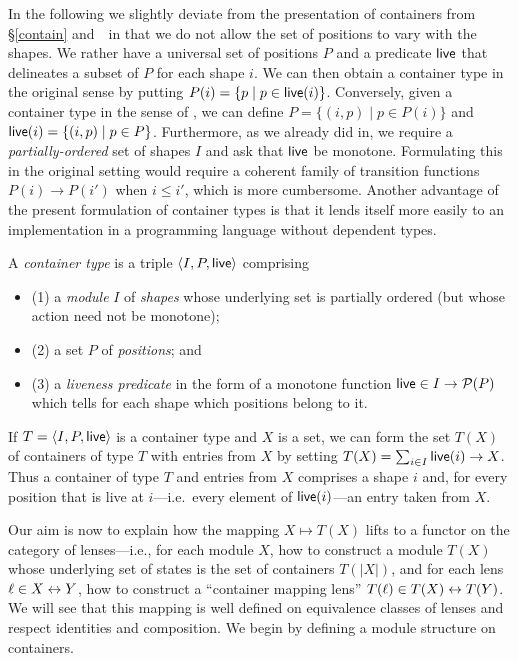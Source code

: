 In the following we slightly deviate from the presentation of
containers from \ifdissertation\S\ref{contain}
and~\cite{1195941}\else\cite{1195941,HofmannPierceWagner10}\fi\ in that we do not
allow the set of positions to vary with the shapes. We rather have a
universal set of positions $P$ and a predicate $\mathsf{live}$ that delineates
a subset of $P$ for each shape $i$. We can then obtain a container
type in the original sense by putting $P(i)=\{p\mid
p\in\mathsf{live}(i)\}$. Conversely, given a container type in the sense of
\cite{1195941}, we can define $P=\{(i,p)\mid p\in P(i)\}$ and
$\mathsf{live}(i)=\{(i,p)\mid p\in P\}$. Furthermore, as we already did
in\symmlenses, we require a \emph{partially-ordered}
set of shapes $I$ and ask that $\mathsf{live}$ be monotone. Formulating
this in the original setting would require a coherent family of
transition functions $P(i)\rightarrow P(i')$ when $i\leq i'$, which is
more cumbersome. Another advantage of the present formulation of
container types is that it lends itself more easily to an
implementation in a programming language without dependent types.
\begin{defn}
A \emph{container type} is a triple $\left<I,P,\mathsf{live}\right>$ comprising 
\iffull \begin{itemize} \fi
\iffull \item \else (1) \fi a \emph{module} $I$ of \emph{shapes} whose underlying set is partially
ordered (but whose action need not be monotone);
\iffull \item \else (2) \fi a set $P$ of \emph{positions}; and
\iffull \item \else (3) \fi a \emph{liveness predicate}
  in the form of a monotone function $\mathsf{live} \in I \to \mathcal{P}(P)$ which tells
  for each shape which positions belong to it.  
\iffull \end{itemize} \fi
\end{defn}

If $T=\langle I,P,\mathsf{live}\rangle$ is a container type and $X$ is a set, we can
form the set $T(X)$ of containers of type $T$ with entries from $X$
by setting
$T(X) = \sum_{i \in I}\mathsf{live}(i) \to X$.  Thus a container of
type $T$ and entries from $X$ comprises a shape $i$ and, for every position
that is live at $i$---i.e.\ every element of $\mathsf{live}(i)$---an entry taken
from $X$.

Our aim is now to explain how the mapping $X\mapsto T(X)$ lifts to a
functor on the category of lenses---i.e., for each module $X$, how
to construct a module $T(X)$ whose underlying set of states is the set
of containers $T(|X|)$, and for each lens $\ell\in X\leftrightarrow Y$, how to
construct a ``container mapping lens'' $T(\ell) \in T(X)\leftrightarrow
T(Y)$. We will see that this mapping is well defined on equivalence classes of lenses
and respect identities and composition.
%
We begin by defining a module structure on containers.  

